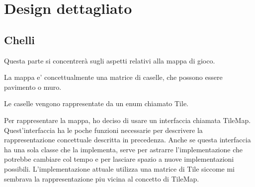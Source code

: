\documentclass[a4paper,12pt]{report}
\begin{document}
    \section{Design dettagliato}
    \subsection{Chelli}
    \par Questa parte si concentrerà sugli aspetti relativi alla mappa di gioco.
    \par
    \par La mappa e' concettualmente una matrice di caselle, che possono essere pavimento o muro.

    \par Le caselle vengono rappresentate da un enum chiamato Tile.

    \par
    \par Per rappresentare la mappa, ho deciso di usare un interfaccia chiamata TileMap.
    Quest'interfaccia ha le poche funzioni necessarie per descrivere la rappresentazione concettuale
    descritta in precedenza.
    Anche se questa interfaccia ha una sola classe che la implementa,
    serve per astrarre l'implementazione che potrebbe cambiare col tempo
    e per lasciare spazio a nuove implementazioni possibili.
    L'implementazione attuale utilizza una matrice di Tile siccome mi sembrava la rappresentazione piu vicina al concetto di TileMap.
\end{document}
